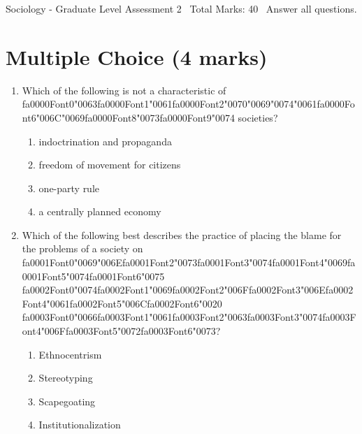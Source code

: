 \documentclass[12pt]{article}
\begin{document}
\begin{center}
Sociology - Graduate Level Assessment 2 \
Total Marks: 40 \
Answer all questions.
\end{center}

\section*{Multiple Choice (4 marks)}
\begin{enumerate}[label=\arabic*.]
\item Which of the following is not a characteristic of {\csname fa0000Font0\endcsname\char"0063}{\csname fa0000Font1\endcsname\char"0061}{\csname fa0000Font2\endcsname\char"0070}{\char"0069}{\char"0074}{\char"0061}{\csname fa0000Font6\endcsname\char"006C}{\char"0069}{\csname fa0000Font8\endcsname\char"0073}{\csname fa0000Font9\endcsname\char"0074} societies?
\begin{enumerate}[label=(\alph*)]
    \item indoctrination and propaganda
    \item freedom of movement for citizens
    \item one-party rule
    \item a centrally planned economy
\end{enumerate}
\item Which of the following best describes the practice of placing the blame for the problems of a society on {\csname fa0001Font0\endcsname\char"0069}{\char"006E}{\csname fa0001Font2\endcsname\char"0073}{\csname fa0001Font3\endcsname\char"0074}{\csname fa0001Font4\endcsname\char"0069}{\csname fa0001Font5\endcsname\char"0074}{\csname fa0001Font6\endcsname\char"0075} {\csname fa0002Font0\endcsname\char"0074}{\csname fa0002Font1\endcsname\char"0069}{\csname fa0002Font2\endcsname\char"006F}{\csname fa0002Font3\endcsname\char"006E}{\csname fa0002Font4\endcsname\char"0061}{\csname fa0002Font5\endcsname\char"006C}{\csname fa0002Font6\endcsname\char"0020} {\csname fa0003Font0\endcsname\char"0066}{\csname fa0003Font1\endcsname\char"0061}{\csname fa0003Font2\endcsname\char"0063}{\csname fa0003Font3\endcsname\char"0074}{\csname fa0003Font4\endcsname\char"006F}{\csname fa0003Font5\endcsname\char"0072}{\csname fa0003Font6\endcsname\char"0073}?
\begin{enumerate}[label=(\alph*)]
    \item Ethnocentrism
    \item Stereotyping
    \item Scapegoating
    \item Institutionalization
\end{enumerate}
\end{enumerate}
\end{document}
